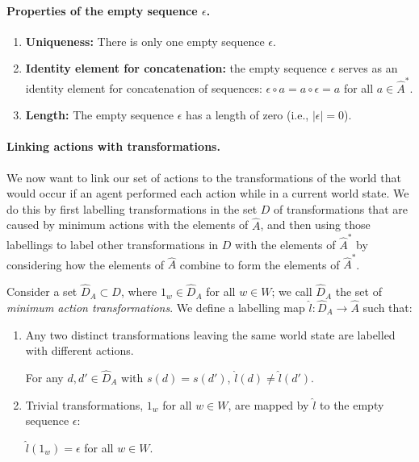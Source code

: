 \paragraph{Properties of the empty sequence $\epsilon$.}
\begin{enumerate}
    \item \textbf{Uniqueness:} There is only one empty sequence $\epsilon$.
    \item \textbf{Identity element for concatenation:} the empty sequence $\epsilon$ serves as an identity element for concatenation of sequences:
    $\epsilon \circ a = a \circ \epsilon = a$ for all $a \in \hat{A}^{*}$.
    \item \textbf{Length:} The empty sequence $\epsilon$ has a length of zero (i.e., $|\epsilon| = 0$).
\end{enumerate}

\paragraph{Linking actions with transformations.}
We now want to link our set of actions to the transformations of the world that would occur if an agent performed each action while in a current world state.
We do this by first labelling transformations in the set $D$ of transformations that are caused by minimum actions with the elements of $\hat{A}$, and then using those labellings to label other transformations in $D$ with the elements of $\hat{A}^{*}$ by considering how the elements of $\hat{A}$ combine to form the elements of $\hat{A}^{*}$.

Consider a set $\hat{D}_{A} \subset D$, where $1_{w} \in \hat{D}_{A}$ for all $w \in W$; we call $\hat{D}_{A}$ the set of \textit{minimum action transformations}.
We define a labelling map $\hat{l}: \hat{D}_{A} \to \hat{A}$ such that:
\begin{enumerate}
    \item Any two distinct transformations leaving the same world state are labelled with different actions.
    \begin{action_condition}\label{actcon:action_gives_single_outcome}
        For any $d,d' \in \hat{D}_{A}$ with $s(d)=s(d')$, $\hat{l}(d) \neq \hat{l}(d')$.
    \end{action_condition}

    \item Trivial transformations, $1_{w}$ for all $w \in W$, are mapped by $\hat{l}$ to the empty sequence $\epsilon$:
    \begin{action_condition}\label{actcon:trivial_transformations_mapped_to_empty_sequence}
        $\hat{l}(1_{w}) = \epsilon$ for all $w \in W$.
    \end{action_condition}
\end{enumerate}

